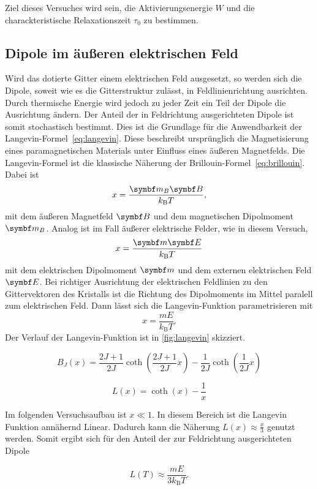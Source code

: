 Ziel dieses Versuches wird sein, die Aktivierungsenergie $W$ und die charackteristische Relaxationszeit $τ_0$ zu bestimmen.

\subsection{Dipole im äußeren elektrischen Feld }

Wird das dotierte Gitter einem elektrischen Feld ausgesetzt, so werden sich die Dipole,
soweit wie es die Gitterstruktur zulässt, in Feldlinienrichtung ausrichten.
Durch thermische Energie wird jedoch zu jeder Zeit ein Teil der Dipole die Ausrichtung ändern.
Der Anteil der in Feldrichtung ausgerichteten Dipole ist somit stochastisch bestimmt.
Dies ist die Grundlage für die Anwendbarkeit der Langevin-Formel~\eqref{eq:langevin}.
Diese beschreibt ursprünglich die Magnetisierung eines paramagnetischen Materials unter Einfluss eines äußeren Magnetfelds.
Die Langevin-Formel ist die klassische
Näherung der Brillouin-Formel~\eqref{eq:brillouin}.
Dabei ist
\begin{equation}
  x = \frac{\v{m}_B \v{B}}{k_\text{B} T},
\end{equation}
mit dem äußeren Magnetfeld $\v{B}$ und dem magnetischen Dipolmoment $\v{m}_B$.
Analog ist im Fall äußerer elektrische Felder, wie in diesem Versuch,
\begin{equation}
  x = \frac{\v{m} \v{E}}{k_\text{B} T}
\end{equation}
mit dem elektrischen Dipolmoment $\v{m}$ und dem externen elektrischen Feld $\v{E}$.
Bei richtiger Ausrichtung der elektrischen Feldlinien zu den Gittervektoren des Kristalls ist die Richtung des Dipolmoments im Mittel paralell zum elektrischen Feld.
Dann lässt sich die Langevin-Funktion parametrisieren mit
\begin{equation}
  x= \frac{m E}{k_\text{B} T}.
\end{equation}
Der Verlauf der Langevin-Funktion ist in \autoref{fig:langevin} skizziert.

\begin{equation}
  B_J(x) =   \frac{2J + 1}{2J} \coth\!\left( \frac{2J + 1}{2J} x \right)
           - \frac{1}{2J} \coth\!\left(\frac{1}{2J} x \right)
  \label{eq:brillouin}
\end{equation}

\begin{equation}
  \label{eq:langevin}
  L(x) = \coth(x) - \frac{1}{x}
\end{equation}
%


Im folgenden Versuchsaufbau ist $ x \ll 1 $. In diesem Bereich ist die Langevin Funktion annähernd Linear.
Dadurch kann die Näherung $L(x) \approx \frac{x}{3}$ genutzt werden.
Somit ergibt sich für den Anteil der zur Feldrichtung ausgerichteten Dipole

\begin{equation}
  L(T) \approx \frac{m E}{3 k_\text{B} T}.
  \label{eq:dipoles}
\end{equation}
